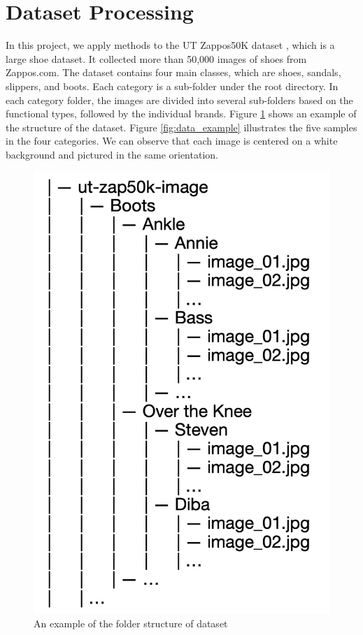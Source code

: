 \section{Dataset Processing}

In this project, we apply methods to the UT Zappos50K dataset \cite{yu2014fine}, which is a large shoe dataset. It collected more than 50,000 images of shoes from Zappos.com. The dataset contains four main classes, which are shoes, sandals, slippers, and boots. Each category is a sub-folder under the root directory. In each category folder, the images are divided into several sub-folders based on the functional types, followed by the individual brands. Figure \ref{fig:data_folder} shows an example of the structure of the dataset. Figure \ref{fig:data_example} illustrates the five samples in the four categories. We can observe that each image is centered on a white background and pictured in the same orientation. 

\begin{figure}[h]
	\includegraphics[width=0.5\linewidth]{figs/data_folder.png}
	\caption{An example of the folder structure of dataset }
	\label{fig:data_folder}
\end{figure}

